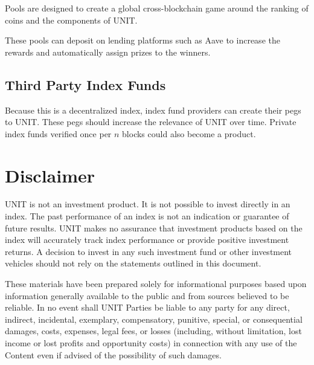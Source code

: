 \documentclass[12pt]{article}
\begin{document}
Pools are designed to create a global cross-blockchain game around the ranking of coins and the components of UNIT.

These pools can deposit on lending platforms such as Aave to increase the rewards and automatically assign prizes to the winners.

\subsection{Third Party Index Funds}

Because this is a decentralized index, index fund providers can create their pegs to UNIT. These pegs should increase the relevance of UNIT over time. Private index funds verified once per $n$ blocks could also become a product. 


\section{Disclaimer}

UNIT is not an investment product. It is not possible to invest directly in an index. The past performance of an index is not an indication or guarantee of future results. UNIT makes no assurance that investment products based on the index will accurately track index performance or provide positive investment returns. A decision to invest in any such investment fund or other investment vehicles should not rely on the statements outlined in this document. 

These materials have been prepared solely for informational purposes based upon information generally available to the public and from sources believed to be reliable. In no event shall UNIT Parties be liable to any party for any direct, indirect, incidental, exemplary, compensatory, punitive, special, or consequential damages, costs, expenses, legal fees, or losses (including, without limitation, lost income or lost profits and opportunity costs) in connection with any use of the Content even if advised of the possibility of such damages.
\end{document}
